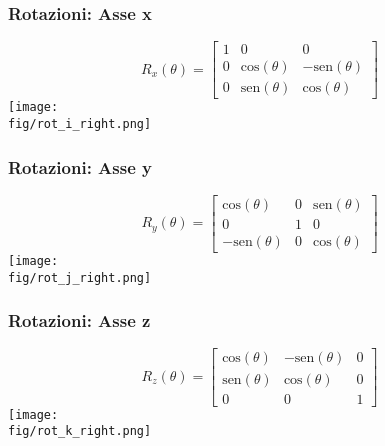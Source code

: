 \begin{frame}
\frametitle{Rotazioni: Asse x}
\begin{equation}
R_x(\theta) = 
\begin{bmatrix}
1 & 0 & 0 \\
0 & \mbox{cos}(\theta) & - \mbox{sen}(\theta)\\
0 & \mbox{sen}(\theta) & \mbox{cos}(\theta)
\end{bmatrix}
\end{equation}
\texttt{[image: \\fig/rot\_i\_right.png]}
\end{frame}
\begin{frame}
\frametitle{Rotazioni: Asse y}
\begin{equation}
R_y(\theta) = 
\begin{bmatrix}
\mbox{cos}(\theta) & 0 & \mbox{sen}(\theta)\\
0 & 1 & 0 \\
-\mbox{sen}(\theta)& 0 & \mbox{cos}(\theta)
\end{bmatrix}
\end{equation}
\texttt{[image: \\fig/rot\_j\_right.png]}
\end{frame}
\begin{frame}
\frametitle{Rotazioni: Asse z}
\begin{equation}
R_z(\theta) = 
\begin{bmatrix}
\mbox{cos}(\theta) & - \mbox{sen}(\theta) & 0\\
\mbox{sen}(\theta) & \mbox{cos}(\theta)   & 0\\ 
0 & 0 & 1 
\end{bmatrix}
\end{equation}
\texttt{[image: \\fig/rot\_k\_right.png]}
\end{frame}
%
